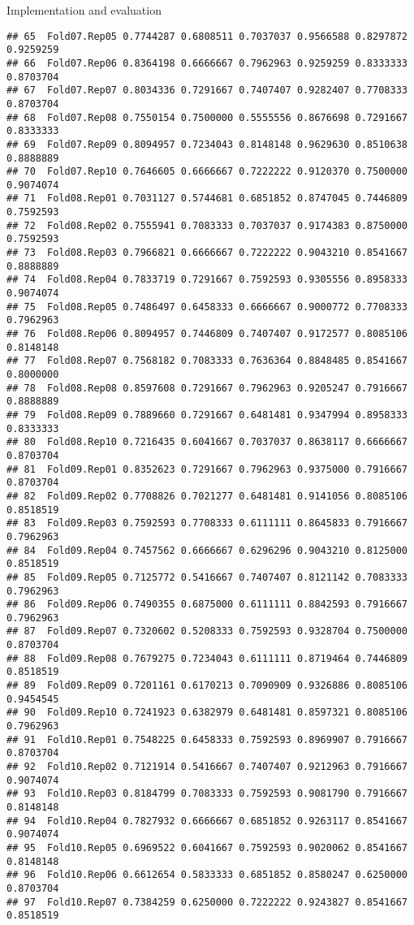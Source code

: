 \documentclass[
  ignorenonframetext,
]{beamer}
\begin{document}
\begin{frame}[fragile]{Implementation and evaluation}
\begin{verbatim}
## 65  Fold07.Rep05 0.7744287 0.6808511 0.7037037 0.9566588 0.8297872 0.9259259
## 66  Fold07.Rep06 0.8364198 0.6666667 0.7962963 0.9259259 0.8333333 0.8703704
## 67  Fold07.Rep07 0.8034336 0.7291667 0.7407407 0.9282407 0.7708333 0.8703704
## 68  Fold07.Rep08 0.7550154 0.7500000 0.5555556 0.8676698 0.7291667 0.8333333
## 69  Fold07.Rep09 0.8094957 0.7234043 0.8148148 0.9629630 0.8510638 0.8888889
## 70  Fold07.Rep10 0.7646605 0.6666667 0.7222222 0.9120370 0.7500000 0.9074074
## 71  Fold08.Rep01 0.7031127 0.5744681 0.6851852 0.8747045 0.7446809 0.7592593
## 72  Fold08.Rep02 0.7555941 0.7083333 0.7037037 0.9174383 0.8750000 0.7592593
## 73  Fold08.Rep03 0.7966821 0.6666667 0.7222222 0.9043210 0.8541667 0.8888889
## 74  Fold08.Rep04 0.7833719 0.7291667 0.7592593 0.9305556 0.8958333 0.9074074
## 75  Fold08.Rep05 0.7486497 0.6458333 0.6666667 0.9000772 0.7708333 0.7962963
## 76  Fold08.Rep06 0.8094957 0.7446809 0.7407407 0.9172577 0.8085106 0.8148148
## 77  Fold08.Rep07 0.7568182 0.7083333 0.7636364 0.8848485 0.8541667 0.8000000
## 78  Fold08.Rep08 0.8597608 0.7291667 0.7962963 0.9205247 0.7916667 0.8888889
## 79  Fold08.Rep09 0.7889660 0.7291667 0.6481481 0.9347994 0.8958333 0.8333333
## 80  Fold08.Rep10 0.7216435 0.6041667 0.7037037 0.8638117 0.6666667 0.8703704
## 81  Fold09.Rep01 0.8352623 0.7291667 0.7962963 0.9375000 0.7916667 0.8703704
## 82  Fold09.Rep02 0.7708826 0.7021277 0.6481481 0.9141056 0.8085106 0.8518519
## 83  Fold09.Rep03 0.7592593 0.7708333 0.6111111 0.8645833 0.7916667 0.7962963
## 84  Fold09.Rep04 0.7457562 0.6666667 0.6296296 0.9043210 0.8125000 0.8518519
## 85  Fold09.Rep05 0.7125772 0.5416667 0.7407407 0.8121142 0.7083333 0.7962963
## 86  Fold09.Rep06 0.7490355 0.6875000 0.6111111 0.8842593 0.7916667 0.7962963
## 87  Fold09.Rep07 0.7320602 0.5208333 0.7592593 0.9328704 0.7500000 0.8703704
## 88  Fold09.Rep08 0.7679275 0.7234043 0.6111111 0.8719464 0.7446809 0.8518519
## 89  Fold09.Rep09 0.7201161 0.6170213 0.7090909 0.9326886 0.8085106 0.9454545
## 90  Fold09.Rep10 0.7241923 0.6382979 0.6481481 0.8597321 0.8085106 0.7962963
## 91  Fold10.Rep01 0.7548225 0.6458333 0.7592593 0.8969907 0.7916667 0.8703704
## 92  Fold10.Rep02 0.7121914 0.5416667 0.7407407 0.9212963 0.7916667 0.9074074
## 93  Fold10.Rep03 0.8184799 0.7083333 0.7592593 0.9081790 0.7916667 0.8148148
## 94  Fold10.Rep04 0.7827932 0.6666667 0.6851852 0.9263117 0.8541667 0.9074074
## 95  Fold10.Rep05 0.6969522 0.6041667 0.7592593 0.9020062 0.8541667 0.8148148
## 96  Fold10.Rep06 0.6612654 0.5833333 0.6851852 0.8580247 0.6250000 0.8703704
## 97  Fold10.Rep07 0.7384259 0.6250000 0.7222222 0.9243827 0.8541667 0.8518519

\end{verbatim}
\end{frame}
\end{document}
